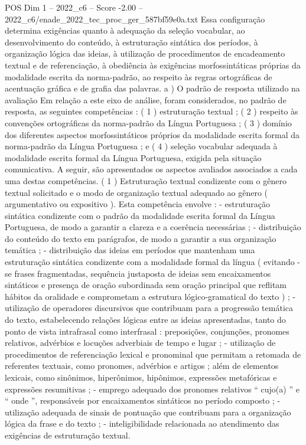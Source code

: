 \begin{textsample}{POS Dim 1 – 2022\_c6 – Score -2.00 – 2022\_c6/enade\_2022\_tec\_proc\_ger\_587bf59e0a.txt}
Essa configuração determina exigências quanto à adequação da seleção vocabular, ao desenvolvimento do conteúdo, à estruturação sintática dos períodos, à organização lógica das ideias, à utilização de procedimentos de encadeamento textual e de referenciação, à obediência às exigências morfossintáticas próprias da modalidade escrita da norma-padrão, ao respeito às regras ortográficas de acentuação gráfica e de grafia das palavras. a ) O padrão de resposta utilizado na avaliação Em relação a este eixo de análise, foram considerados, no padrão de resposta, as seguintes competências : ( 1 ) estruturação textual ; ( 2 ) respeito às convenções ortográficas da norma-padrão da Língua Portuguesa ; ( 3 ) domínio dos diferentes aspectos morfossintáticos próprios da modalidade escrita formal da norma-padrão da Língua Portuguesa ; e ( 4 ) seleção vocabular adequada à modalidade escrita formal da Língua Portuguesa, exigida pela situação comunicativa.
A seguir, são apresentados os aspectos avaliados associados a cada uma destas competências. ( 1 ) Estruturação textual condizente com o gênero textual solicitado e o modo de organização textual adequado ao gênero ( argumentativo ou expositivo ).
Esta competência envolve : - estruturação sintática condizente com o padrão da modalidade escrita formal da Língua Portuguesa, de modo a garantir a clareza e a coerência necessárias ; - distribuição do conteúdo do texto em parágrafos, de modo a garantir a sua organização temática ; - distribuição das ideias em períodos que mantenham uma estruturação sintática condizente com a modalidade formal da língua ( evitando -se frases fragmentadas, sequência justaposta de ideias sem encaixamentos sintáticos e presença de oração subordinada sem oração principal que reflitam hábitos da oralidade e comprometam a estrutura lógico-gramatical do texto ) ; - utilização de operadores discursivos que contribuam para a progressão temática do texto, estabelecendo relações lógicas entre as ideias apresentadas, tanto do ponto de vista intrafrasal como interfrasal : preposições, conjunções, pronomes relativos, advérbios e locuções adverbiais de tempo e lugar ; - utilização de procedimentos de referenciação lexical e pronominal que permitam a retomada de referentes textuais, como pronomes, advérbios e artigos ; além de elementos lexicais, como sinônimos, hiperônimos, hipônimos, expressões metafóricas e expressões resumitivas ; - emprego adequado dos pronomes relativos “ cujo(a) ” e “ onde ”, responsáveis por encaixamentos sintáticos no período composto ; - utilização adequada de sinais de pontuação que contribuam para a organização lógica da frase e do texto ; - inteligibilidade relacionada ao atendimento das exigências de estruturação textual.

\end{textsample}
